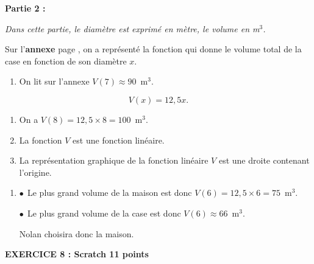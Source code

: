 \documentclass[10pt]{article}
\begin{document}
\textbf{Partie 2 :}

\medskip

\emph{Dans cette partie, le diamètre est exprimé en mètre, le volume en m$^3$.}

\medskip

Sur l'\textbf{annexe } page \pageref{annexe1}, on a représenté la fonction qui donne le volume total de la case en fonction de son diamètre $x$.

\medskip

\begin{enumerate}
\item %

On lit sur l'annexe $V(7) \approx 90$~m$^3$.
\end{enumerate}


\[V(x) = 12,5 x.\]

\begin{enumerate}[resume]
\item %
On a $V(8) = 12,5 \times 8 = 100$~m$^3$.
\item %
La fonction $V$ est une fonction linéaire.
\item %
La représentation graphique de la fonction linéaire $V$ est une droite contenant l'origine.
\end{enumerate}

\begin{enumerate}[resume]
\item %
$\bullet~~$Le plus grand volume de la maison est donc $V(6) = 12,5 \times 6 = 75$~m$^3$.

$\bullet~~$Le plus grand volume de la case est donc $V(6) \approx 66$~m$^3$.

Nolan choisira donc la maison.
\end{enumerate}

\vspace{0,5cm}

\textbf{EXERCICE 8 : Scratch \hfill 11 points}
\end{document}
